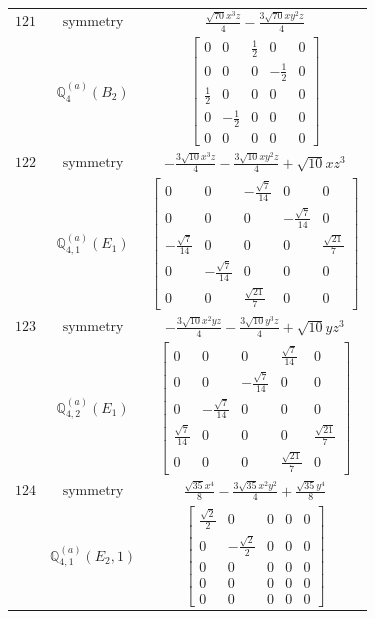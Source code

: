 \documentclass[fleqn,8pt,landscape]{jsarticle}
\begin{document}
\begin{longtable}{ccc}
$ 121 $ & $ \text{symmetry} $ & $ \frac{\sqrt{70} x^{3} z}{4} - \frac{3 \sqrt{70} x y^{2} z}{4} $ \\
$  $ & $ \mathbb{Q}_{4}^{(a)}(B_{2}) $ & $ \begin{bmatrix} 0 & 0 & \frac{1}{2} & 0 & 0 \\ 0 & 0 & 0 & - \frac{1}{2} & 0 \\ \frac{1}{2} & 0 & 0 & 0 & 0 \\ 0 & - \frac{1}{2} & 0 & 0 & 0 \\ 0 & 0 & 0 & 0 & 0 \end{bmatrix} $ \\ \hline
$ 122 $ & $ \text{symmetry} $ & $ - \frac{3 \sqrt{10} x^{3} z}{4} - \frac{3 \sqrt{10} x y^{2} z}{4} + \sqrt{10} x z^{3} $ \\
$  $ & $ \mathbb{Q}_{4,1}^{(a)}(E_{1}) $ & $ \begin{bmatrix} 0 & 0 & - \frac{\sqrt{7}}{14} & 0 & 0 \\ 0 & 0 & 0 & - \frac{\sqrt{7}}{14} & 0 \\ - \frac{\sqrt{7}}{14} & 0 & 0 & 0 & \frac{\sqrt{21}}{7} \\ 0 & - \frac{\sqrt{7}}{14} & 0 & 0 & 0 \\ 0 & 0 & \frac{\sqrt{21}}{7} & 0 & 0 \end{bmatrix} $ \\ \hline
$ 123 $ & $ \text{symmetry} $ & $ - \frac{3 \sqrt{10} x^{2} y z}{4} - \frac{3 \sqrt{10} y^{3} z}{4} + \sqrt{10} y z^{3} $ \\
$  $ & $ \mathbb{Q}_{4,2}^{(a)}(E_{1}) $ & $ \begin{bmatrix} 0 & 0 & 0 & \frac{\sqrt{7}}{14} & 0 \\ 0 & 0 & - \frac{\sqrt{7}}{14} & 0 & 0 \\ 0 & - \frac{\sqrt{7}}{14} & 0 & 0 & 0 \\ \frac{\sqrt{7}}{14} & 0 & 0 & 0 & \frac{\sqrt{21}}{7} \\ 0 & 0 & 0 & \frac{\sqrt{21}}{7} & 0 \end{bmatrix} $ \\ \hline
$ 124 $ & $ \text{symmetry} $ & $ \frac{\sqrt{35} x^{4}}{8} - \frac{3 \sqrt{35} x^{2} y^{2}}{4} + \frac{\sqrt{35} y^{4}}{8} $ \\
$  $ & $ \mathbb{Q}_{4,1}^{(a)}(E_{2},1) $ & $ \begin{bmatrix} \frac{\sqrt{2}}{2} & 0 & 0 & 0 & 0 \\ 0 & - \frac{\sqrt{2}}{2} & 0 & 0 & 0 \\ 0 & 0 & 0 & 0 & 0 \\ 0 & 0 & 0 & 0 & 0 \\ 0 & 0 & 0 & 0 & 0 \end{bmatrix} $ \\ \hline

\end{longtable}
\end{document}
